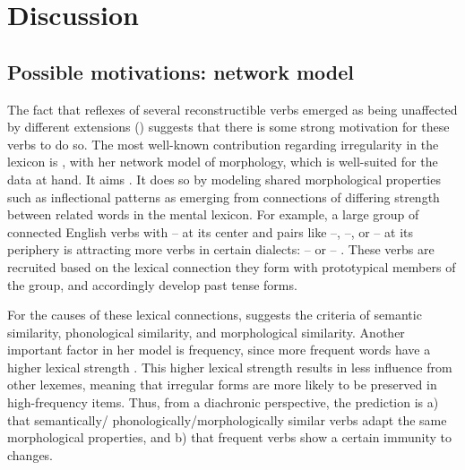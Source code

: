 \section{Discussion}
\label{sec:discussion}


\subsection{Possible motivations:  network model}
\label{sec:motivations}
The fact that reflexes of several reconstructible verbs emerged as being unaffected by different extensions () suggests that there is some strong motivation for these verbs to do so.
The most well-known contribution regarding irregularity in the lexicon is \textcite{bybee1985morphology}, with her network model of morphology, which is well-suited for the data at hand.
It aims  \parencite[428]{bybee1995regular}.
It does so by modeling shared morphological properties such as inflectional patterns as emerging from connections of differing strength between related words in the mental lexicon.
For example, a large group of connected  English verbs with -- at its center and pairs like --, --, or -- at its periphery is attracting more verbs in certain dialects: -- or -- \parencite[129--130]{bybee1985morphology}.
These verbs are recruited based on the lexical connection they form with prototypical members of the group, and accordingly develop  past tense forms.

For the causes of these lexical connections, \textcite[118]{bybee1985morphology} suggests the criteria of semantic similarity, phonological similarity, and morphological similarity.
Another important factor in her model is frequency, since more frequent words have a higher lexical strength \parencite[119]{bybee1985morphology}.
This higher lexical strength results in less influence from other lexemes, meaning that irregular forms are more likely to be preserved in high-frequency items.
Thus, from a diachronic perspective, the prediction is a) that semantically\slash{} phonologically\slash{}morphologically similar verbs adapt the same morphological properties, and b) that frequent verbs show a certain immunity to changes.

